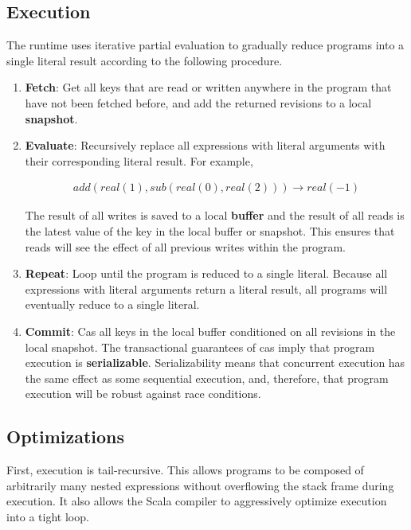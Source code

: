 \documentclass[../main.tex]{subfiles}
\begin{document}
  \subsection{Execution}
  The runtime uses iterative partial evaluation to gradually reduce programs into a
  single literal result according to the following procedure.

  \begin{enumerate}
    \item \textbf{Fetch}: Get all keys that are read or written anywhere in the program that have
          not been fetched before, and add the returned revisions to a local \textbf{snapshot}.
    \item \textbf{Evaluate}: Recursively replace all expressions with literal arguments with their
          corresponding literal result. For example,

          \[
          \begin{gathered}
          add(real(1), sub(real(0), real(2))) \rightarrow real(-1)
          \end{gathered}
          \]

          The result of all writes is saved to a local \textbf{buffer} and the result of all reads
          is the latest value of the key in the local buffer or snapshot. This ensures that reads
          will see the effect of all previous writes within the program.
    \item \textbf{Repeat}: Loop until the program is reduced to a single literal. Because all
          expressions with literal arguments return a literal result, all programs will eventually
          reduce to a single literal.
    \item \textbf{Commit}: Cas all keys in the local buffer conditioned on all revisions in
          the local snapshot. The transactional guarantees of cas imply that program execution is
          \textbf{serializable}. Serializability means that concurrent execution has the
          same effect as some sequential execution, and, therefore, that program execution will be
          robust against race conditions.
  \end{enumerate}

  \subsection{Optimizations}
  First, execution is tail-recursive. This allows programs to be composed of arbitrarily many
  nested expressions without overflowing the stack frame during execution. It also allows the Scala
  compiler to aggressively optimize execution into a tight loop.
\end{document}
